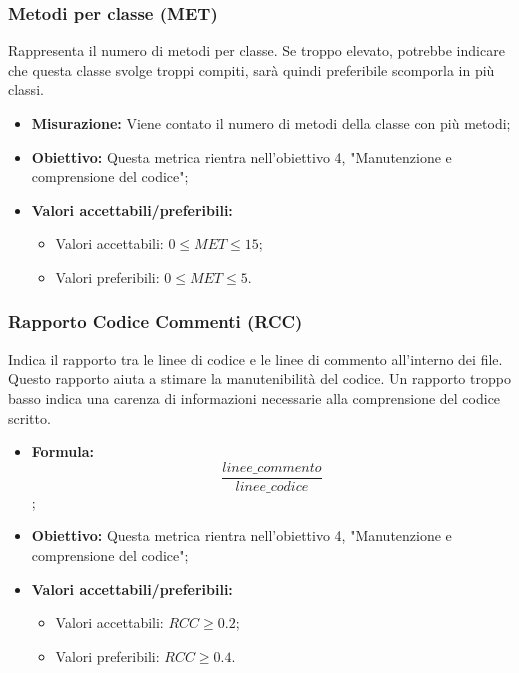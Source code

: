 \subsubsection{Metodi per classe (MET)}
Rappresenta il numero di metodi per classe. Se troppo elevato, potrebbe indicare che questa classe svolge troppi compiti, sarà quindi preferibile scomporla in più classi.
\begin{itemize}
	\item \textbf{Misurazione:} Viene contato il numero di metodi della classe con più metodi;
	\item \textbf{Obiettivo:} Questa metrica rientra nell'obiettivo 4, "Manutenzione e comprensione del codice";
	\item \textbf{Valori accettabili/preferibili: }
	\begin{itemize}
		\item Valori accettabili: $0\leq MET \leq 15$;
		\item Valori preferibili: $0\leq MET \leq 5$.
	\end{itemize}
\end{itemize}

\subsubsection{Rapporto Codice Commenti (RCC)}
Indica il rapporto tra le linee di codice e le linee di commento all'interno dei file. Questo rapporto aiuta a stimare la manutenibilità del codice. Un rapporto troppo basso indica una carenza di informazioni necessarie alla comprensione del codice scritto.
\begin{itemize}
	\item \textbf{Formula:} \[\frac{linee\_commento}{linee\_codice}\];
	\item \textbf{Obiettivo:} Questa metrica rientra nell'obiettivo 4, "Manutenzione e comprensione del codice";
	\item \textbf{Valori accettabili/preferibili: }
	\begin{itemize}
		\item Valori accettabili: $RCC \geq 0.2$;
		\item Valori preferibili: $RCC \geq 0.4$.
	\end{itemize}
\end{itemize}


